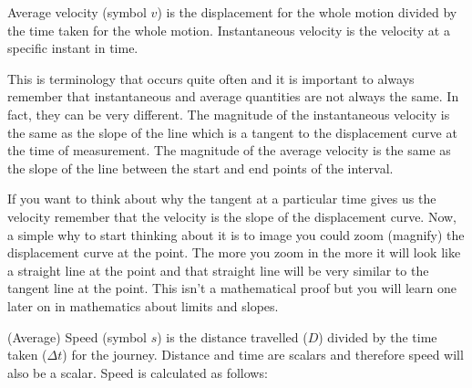       \label{m38791*id64500}Average velocity (symbol \begin{math}v\end{math}) is the displacement for the whole motion divided by the time taken for the whole motion. Instantaneous velocity is the velocity at a specific instant in time.\par 
      \label{m38791*eip-536}This is terminology that occurs quite often and it is important to always remember that instantaneous and average quantities are not always the same. In fact, they can be very different. The magnitude of the instantaneous velocity is the same as the slope of the line which is a tangent to the displacement curve at the time of measurement. The magnitude of the average velocity is the same as the slope of the line between the start and end points of the interval. \par \label{m38791*eip-668}If you want to think about why the tangent at a particular time gives us the velocity remember that the velocity is the slope of the displacement curve. Now, a simple why to start thinking about it is to image you could zoom (magnify) the displacement curve at the point. The more you zoom in the more it will look like a straight line at the point and that straight line will be very similar to the tangent line at the point. This isn't a mathematical proof but you will learn one later on in mathematics about limits and slopes. \par \label{m38791*id64514}(Average) Speed (symbol \begin{math}s\end{math}) is the distance travelled (\begin{math}D\end{math}) divided by the time taken (\begin{math}\Delta t\end{math}) for the journey. Distance and time are scalars and therefore speed will also be a scalar. Speed is calculated as follows:\par 
      \label{m38791*id64549}\nopagebreak\noindent{}
